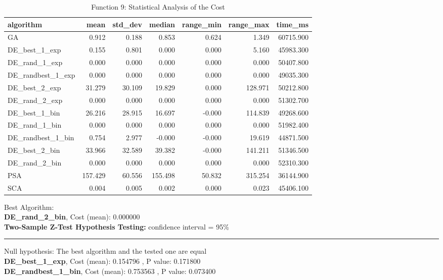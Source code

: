 \documentclass[12pt]{article}
\begin{document}
\begin{table}[H]
    \centering
    \footnotesize
\begin{tabular}{lrrrrrr}
\toprule
         algorithm &    mean &  std\_dev &  median &  range\_min &  range\_max &   time\_ms \\
\midrule
                GA &   0.912 &    0.188 &   0.853 &      0.624 &      1.349 & 60715.900 \\
     DE\_best\_1\_exp &   0.155 &    0.801 &   0.000 &      0.000 &      5.160 & 45983.300 \\
     DE\_rand\_1\_exp &   0.000 &    0.000 &   0.000 &      0.000 &      0.000 & 50407.800 \\
 DE\_randbest\_1\_exp &   0.000 &    0.000 &   0.000 &      0.000 &      0.000 & 49035.300 \\
     DE\_best\_2\_exp &  31.279 &   30.109 &  19.829 &      0.000 &    128.971 & 50212.800 \\
     DE\_rand\_2\_exp &   0.000 &    0.000 &   0.000 &      0.000 &      0.000 & 51302.700 \\
     DE\_best\_1\_bin &  26.216 &   28.915 &  16.697 &     -0.000 &    114.839 & 49268.600 \\
     DE\_rand\_1\_bin &   0.000 &    0.000 &   0.000 &      0.000 &      0.000 & 51982.400 \\
 DE\_randbest\_1\_bin &   0.754 &    2.977 &  -0.000 &     -0.000 &     19.619 & 44871.500 \\
     DE\_best\_2\_bin &  33.966 &   32.589 &  39.382 &     -0.000 &    141.211 & 51346.500 \\
     DE\_rand\_2\_bin &   0.000 &    0.000 &   0.000 &      0.000 &      0.000 & 52310.300 \\
               PSA & 157.429 &   60.556 & 155.498 &     50.832 &    315.254 & 36144.900 \\
               SCA &   0.004 &    0.005 &   0.002 &      0.000 &      0.023 & 45406.100 \\
\bottomrule
\end{tabular}

\caption{Function 9: Statistical Analysis of the Cost} 
    \end{table}
Best Algorithm: \\
\textbf{DE\_rand\_2\_bin}, Cost (mean): 0.000000\\
\noindent
\textbf{Two-Sample Z-Test Hypothesis Testing: }
confidence interval = 95\%\\
\vspace{-3mm}
\rule[3mm]{\linewidth}{0.2pt}
Null hypothesis: The best algorithm and the tested one are equal\\
\textbf{DE\_best\_1\_exp}, Cost (mean): 0.154796
, P value: 0.171800\\
\textbf{DE\_randbest\_1\_bin}, Cost (mean): 0.753563
, P value: 0.073400\\
\newpage
\end{document}
